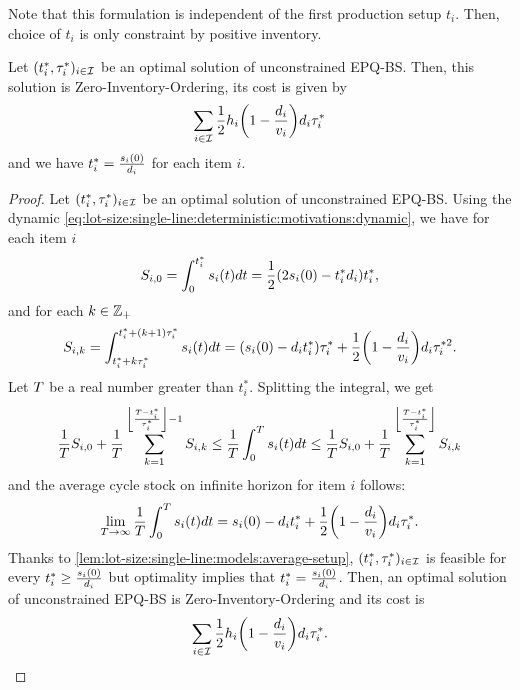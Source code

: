 Note that this formulation is independent of the first production setup $t_i$.
Then, choice of $t_i$ is only constraint by positive inventory.


\begin{lem}\label{lem:lot-size:single-line:models:ZIO}
Let $\bracket{t_i^*,\cover_i^*}_{i\in\REF}$ be an optimal solution of unconstrained EPQ-BS.
Then, this solution is Zero-Inventory-Ordering, its cost is given by
\begin{equation}
  \sum_{i\in\REF}\frac{1}{2}\holding_i\bracket{1-\frac{\demand_i}{\rate_i}}\demand_i\cover_i^*
\end{equation}
and we have $t_i^*=\frac{s_i(0)}{d_i}$ for each item $i$.
\end{lem}


\begin{proof}
Let $\bracket{t_i^*,\cover_i^*}_{i\in\REF}$ be an optimal solution of unconstrained EPQ-BS.
Using the dynamic \eqref{eq:lot-size:single-line:deterministic:motivations:dynamic}, we have for each item $i$
\begin{equation}
  S_{i,0}
  =
  \int_0^{t_i^*}\inventory_i\bracket{t}dt
  = \frac{1}{2}\bracket{2\inventory_i\bracket{0}-t_i^*\demand_i}t_i^*,
\end{equation}
and for each $k\in\mathbb{Z}_+$
\begin{equation}
  S_{i,k}
  =
  \int_{t_i^*+k\cover_i^*}^{t_i^*+\bracket{k+1}\cover_i^*}\inventory_i(t)dt
  =
  \bracket{\inventory_i(0)-\demand_i t_i^*}\cover_i^*
  + \frac{1}{2}\bracket{1-\frac{\demand_i}{\rate_i}}\demand_i\cover_i^{*2}.
\end{equation}
Let $T$ be a real number greater than $t_i^*$.
Splitting the integral, we get
\begin{equation}
  \frac{1}{\horizon} S_{i,0}
  + \frac{1}{\horizon} \sum_{k=1}^{\left\lfloor\frac{\horizon-t_i^*}{\cover_i^*}\right\rfloor-1} S_{i,k}
  \le
  \frac{1}{\horizon} \int_0^{\horizon}\inventory_i\bracket{t}dt
  \le
  \frac{1}{\horizon} S_{i,0}
  + \frac{1}{\horizon} \sum_{k=1}^{\left\lfloor\frac{\horizon-t_i^*}{\cover_i^*}\right\rfloor} S_{i,k}
\end{equation}
and the average cycle stock on infinite horizon for item $i$ follows:
\begin{equation}
  \lim_{\horizon\rightarrow\infty} \frac{1}{\horizon} \int_0^{\horizon}\inventory_i\bracket{t}dt
  =
  \inventory_i(0)-\demand_i t_i^*
  + \frac{1}{2}\bracket{1-\frac{\demand_i}{\rate_i}}\demand_i\cover_i^*.
\end{equation}
Thanks to \cref{lem:lot-size:single-line:models:average-setup}, $\bracket{t_i^*,\cover_i^*}_{i\in\REF}$ is feasible for every $t_i^*\ge\frac{s_i(0)}{d_i}$ but optimality implies that $t_i^*=\frac{s_i(0)}{d_i}$.
Then, an optimal solution of unconstrained EPQ-BS is Zero-Inventory-Ordering and its cost is
\begin{equation}
  \sum_{i\in\REF}\frac{1}{2}\holding_i\bracket{1-\frac{\demand_i}{\rate_i}}\demand_i\cover_i^*.
\end{equation}
\end{proof}


